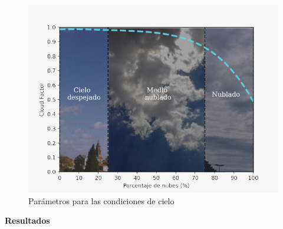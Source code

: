 \documentclass{article}
\begin{document}
\begin{multicols}{2}
\begin{figure}[H]
    \centering
    \includegraphics[scale=0.5]{images/nubes.png}
    \caption{Parámetros para las condiciones de cielo}
\end{figure}
\begin{center}
\begin{shaded}
\textbf{\textcolor{na}{Resultados}}
\end{shaded}
\end{center}
\vspace{-0.2cm}
\begin{figure}[H]
   \centering
   \begin{subfigure}[H]{0.5\linewidth}

\end{subfigure}
\end{figure}
\end{multicols}
\end{document}
